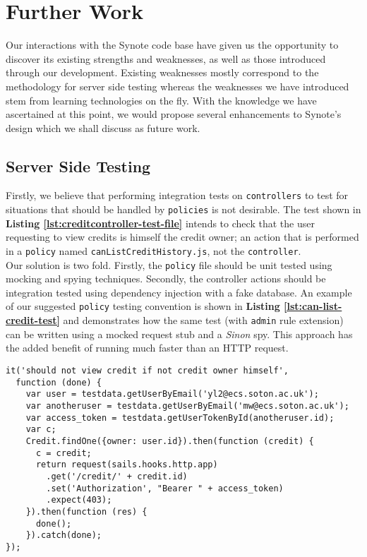 \chapter{Further Work}
\label{chap:further-work}

Our interactions with the Synote code base have given us the opportunity to discover its existing strengths and weaknesses, as well as those introduced through our development. Existing weaknesses mostly correspond to the methodology for server side testing whereas the weaknesses we have introduced stem from learning technologies on the fly. With the knowledge we have ascertained at this point, we would propose several enhancements to Synote's design which we shall discuss as future work.

\section{Server Side Testing}
\label{subsec:server-side-testing}

Firstly, we believe that performing integration tests on \texttt{controllers} to test for situations that should be handled by \texttt{policies} is not desirable. The test shown in \textbf{Listing \ref{lst:creditcontroller-test-file}} intends to check that the user requesting to view credits is himself the credit owner; an action that is performed in a \texttt{policy} named \texttt{canListCreditHistory.js}, not the \texttt{controller}.\\

Our solution is two fold. Firstly, the \texttt{policy} file should be unit tested using mocking and spying techniques. Secondly, the controller actions should be integration tested using dependency injection with a fake database. An example of our suggested \texttt{policy} testing convention is shown in \textbf{Listing \ref{lst:can-list-credit-test}} and demonstrates how the same test (with \texttt{admin} rule extension) can be written using a mocked request stub and a \textit{Sinon} spy. This approach has the added benefit of running much faster than an HTTP request.\\

\begin{listing}[H]
\begin{verbatim}
it('should not view credit if not credit owner himself',
  function (done) {
    var user = testdata.getUserByEmail('yl2@ecs.soton.ac.uk');
    var anotheruser = testdata.getUserByEmail('mw@ecs.soton.ac.uk');
    var access_token = testdata.getUserTokenById(anotheruser.id);
    var c;
    Credit.findOne({owner: user.id}).then(function (credit) {
      c = credit;
      return request(sails.hooks.http.app)
        .get('/credit/' + credit.id)
        .set('Authorization', "Bearer " + access_token)
        .expect(403);
    }).then(function (res) {
      done();
    }).catch(done);
});
\end{verbatim}
\label{lst:creditcontroller-test-file}
\end{listing}

